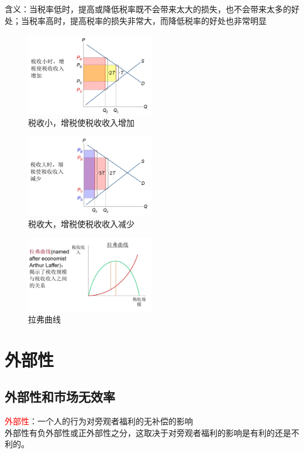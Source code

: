 \documentclass[12pt,a4paper]{article}
\begin{document}
含义：当税率低时，提高或降低税率既不会带来太大的损失，也不会带来太多的好处；当税率高时，提高税率的损失非常大，而降低税率的好处也非常明显
\begin{figure}[H] 
  \centering %
  \includegraphics[width=0.5\textwidth]{税收小.png} 
  \caption{税收小，增税使税收收入增加} %
\end{figure}
\begin{figure}[H] 
  \centering %
  \includegraphics[width=0.5\textwidth]{税收大.png} 
  \caption{税收大，增税使税收收入减少} %
\end{figure}
\begin{figure}[H] 
  \centering %
  \includegraphics[width=0.5\textwidth]{拉弗曲线.png} 
  \caption{拉弗曲线} %
\end{figure}

\newpage
\section{外部性} 

\subsection{外部性和市场无效率}
\textcolor{red}{外部性}：一个人的行为对旁观者福利的无补偿的影响\\
外部性有负外部性或正外部性之分，这取决于对旁观者福利的影响是有利的还是不利的。\\
\end{document}
